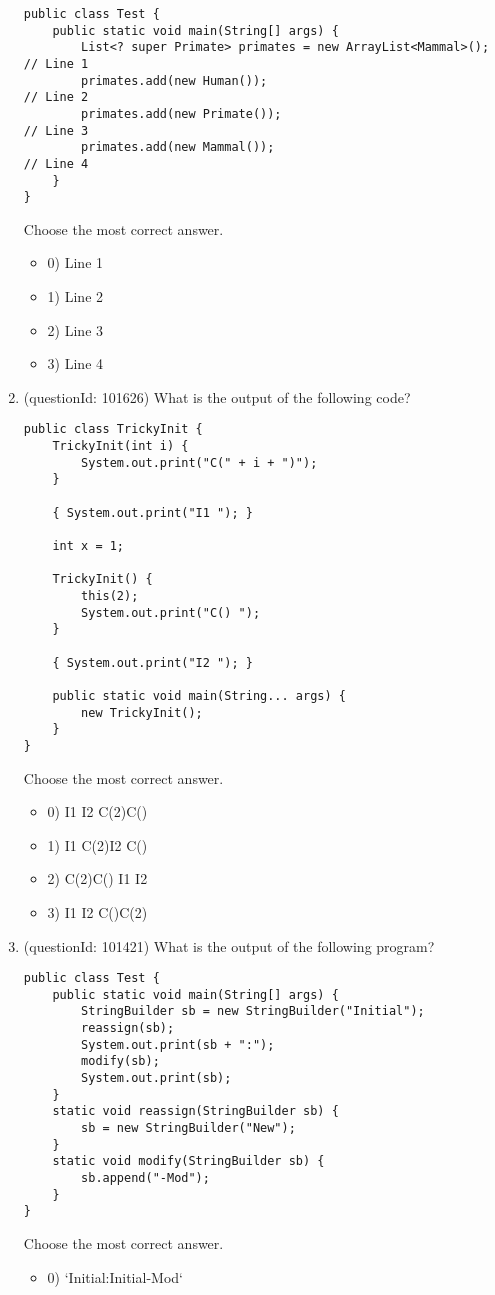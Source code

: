 \documentclass[12pt]{article}
\begin{document}
\begin{enumerate}[label=(\arabic*)]
\begin{verbatim}
public class Test {
    public static void main(String[] args) {
        List<? super Primate> primates = new ArrayList<Mammal>(); // Line 1
        primates.add(new Human());                                // Line 2
        primates.add(new Primate());                              // Line 3
        primates.add(new Mammal());                               // Line 4
    }
}
\end{verbatim}
Choose the most correct answer. 
\begin{itemize}
\item 0) Line 1

\item 1) Line 2

\item 2) Line 3

\item 3) Line 4

\end{itemize}
\item (questionId: 101626) What is the output of the following code?\n\begin{verbatim}
public class TrickyInit {
    TrickyInit(int i) {
        System.out.print("C(" + i + ")");
    }

    { System.out.print("I1 "); }

    int x = 1;

    TrickyInit() {
        this(2);
        System.out.print("C() ");
    }

    { System.out.print("I2 "); }

    public static void main(String... args) {
        new TrickyInit();
    }
}
\end{verbatim}
Choose the most correct answer. 
\begin{itemize}
\item 0) I1 I2 C(2)C()

\item 1) I1 C(2)I2 C()

\item 2) C(2)C() I1 I2

\item 3) I1 I2 C()C(2)

\end{itemize}
\item (questionId: 101421) What is the output of the following program?
\begin{verbatim}
public class Test {
    public static void main(String[] args) {
        StringBuilder sb = new StringBuilder("Initial");
        reassign(sb);
        System.out.print(sb + ":");
        modify(sb);
        System.out.print(sb);
    }
    static void reassign(StringBuilder sb) {
        sb = new StringBuilder("New");
    }
    static void modify(StringBuilder sb) {
        sb.append("-Mod");
    }
}
\end{verbatim}
Choose the most correct answer. 
\begin{itemize}
\item 0) `Initial:Initial-Mod`


\end{itemize}
\end{enumerate}
\end{document}
